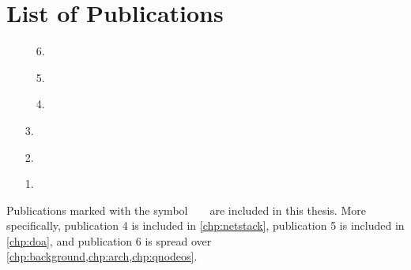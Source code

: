 \chapter*{List of Publications}

\def\ticon{{\footnotesize \faFileTextO}}

\begin{enumerate}[label={\ticon~~\arabic*.},itemsep=\baselineskip]
    \item[\ticon~~6.] 
    \item[\ticon~~5.] 
    \item[\ticon~~4.] 
    \item[3.] 
    \item[2.] 
    \item[1.] 
\end{enumerate}

\vspace{2\baselineskip}
\noindent
Publications marked with the symbol~~\ticon~~are included in this thesis. More specifically,
publication 4 is included in \cref{chp:netstack}, publication 5 is included in \cref{chp:doa}, and
publication 6 is spread over \cref{chp:background,chp:arch,chp:qnodeos}.

\printbibliography[heading=subbibintoc,title={References},notcategory=noprint]
